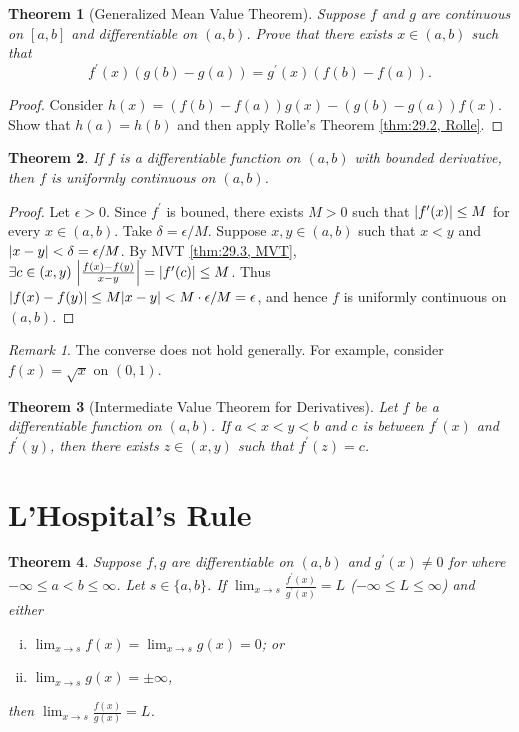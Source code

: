 \documentclass[12pt, lettersize]{book}
\theoremstyle{plain}
\newtheorem{thm}{Theorem}[section]
\theoremstyle{definition}
\theoremstyle{remark}
\newtheorem*{rem}{Remark}
\begin{document}
			\begin{thm}[Generalized Mean Value Theorem]
			Suppose $f$ and $g$ are continuous on $[a,b]$ and differentiable on $(a,b)$. Prove that there exists $x\in(a,b)$ such that
			\begin{displaymath}
				f^\prime(x)(g(b)-g(a))=g^\prime(x)(f(b)-f(a)).
			\end{displaymath}
			\end{thm}
			\begin{proof}
				Consider $h(x)=(f(b)-f(a))g(x)-(g(b)-g(a))f(x)$. Show that $h(a)=h(b)$ and then apply Rolle's Theorem \ref{thm:29.2, Rolle}.
			\end{proof}
			
			\begin{thm}
			If $f$ is a differentiable function on $(a,b)$ with bounded derivative, then $f$ is uniformly continuous on $(a,b)$.
			\end{thm}
			\begin{proof}
			Let $\epsilon>0$. Since $f^\prime$ is bouned, there exists $M>0$ such that $\abs{f^\prime(x)}\leq M$ for every $x\in(a,b)$. Take $\delta=\epsilon/M$. Suppose $x,y\in(a,b)$ such that $x<y$ and $\abs{x-y}<\delta=\epsilon/M$. By MVT \ref{thm:29.3, MVT}, $\exists c\in(x,y)\ \abs{\frac{f(x)-f(y)}{x-y}}=\abs{f^\prime(c)}\leq M$. Thus $\abs{f(x)-f(y)}\leq M\abs{x-y}<M\cdot\epsilon/M=\epsilon$, and hence $f$ is uniformly continuous on $(a,b)$. 
			\end{proof}
			\begin{rem}
			The converse does not hold generally. For example, consider $f(x)=\sqrt{x}$ on $(0,1)$. 
			\end{rem}
			
			\begin{thm}[Intermediate Value Theorem for Derivatives]
			Let $f$ be a differentiable function on $(a,b)$. If $a<x<y<b$ and $c$ is between $f^\prime(x)$ and $f^\prime(y)$, then there exists $z\in(x,y)$ such that $f^\prime(z)=c$. 
			\end{thm}
			\newpage
			
		\section{L'Hospital's Rule}
			\begin{thm}
			Suppose $f,g$ are differentiable on $(a,b)$ and $g^\prime(x)\neq0$ for where $-\infty\leq a<b\leq\infty$. Let $s\in\{a,b\}$. If $\lim_{x\rightarrow s}\frac{f^\prime(x)}{g^\prime(x)}=L$ ($-\infty\leq L\leq \infty$) and either
			\begin{enumerate}[(i)]
				\item $\lim_{x\rightarrow s}f(x)=\lim_{x\rightarrow s}g(x)=0$; or
				\item $\lim_{x\rightarrow s}g(x)=\pm\infty$,
			\end{enumerate} 
			then $\lim_{x\rightarrow s}\frac{f(x)}{g(x)}=L$.
			\end{thm}
			\newpage
\end{document}

